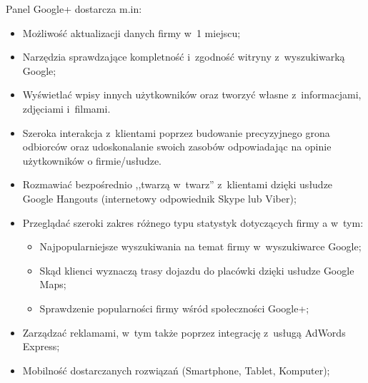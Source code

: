 Panel Google+ dostarcza m.in:

\begin{itemize}
\item Możliwość aktualizacji danych firmy w~1 miejscu;

\item Narzędzia sprawdzające kompletność i~zgodność witryny z~wyszukiwarką \mbox{Google};

\item Wyświetlać wpisy innych użytkowników oraz tworzyć własne z~informacjami, zdjęciami i~filmami.

\item Szeroka interakcja z~klientami poprzez budowanie precyzyjnego grona odbiorców oraz udoskonalanie swoich zasobów odpowiadając na opinie użytkowników o firmie/usłudze.

\item Rozmawiać bezpośrednio ,,twarzą w~twarz'' z~klientami dzięki usłudze Google Hangouts (internetowy odpowiednik Skype lub Viber);

\item Przeglądać szeroki zakres różnego typu statystyk dotyczących firmy a w~tym:
    \begin{itemize}
    \item Najpopularniejsze wyszukiwania na temat firmy w~wyszukiwarce Google;
    \item Skąd klienci wyznaczą trasy dojazdu do placówki dzięki usłudze Google Maps;
    \item Sprawdzenie popularności firmy wśród społeczności Google+;
    \end{itemize}

\item Zarządzać reklamami, w~tym także poprzez integrację z~usługą AdWords Express;

\item Mobilność dostarczanych rozwiązań (Smartphone, Tablet, Komputer);
\end{itemize}


